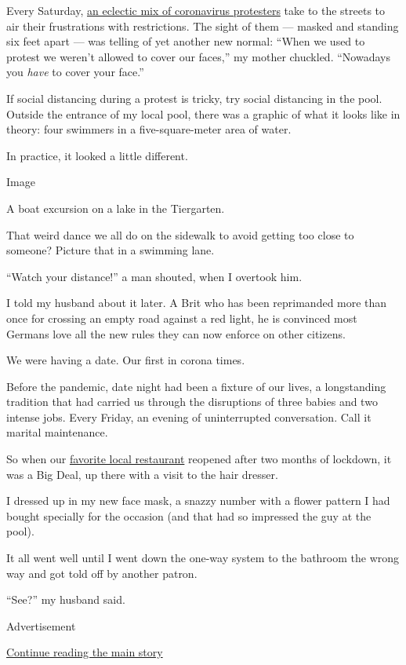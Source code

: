 Every Saturday,
\href{https://www.nytimes.com/2020/05/18/world/europe/coronavirus-germany-far-right.html}{an
eclectic mix of coronavirus protesters} take to the streets to air their
frustrations with restrictions. The sight of them --- masked and
standing six feet apart --- was telling of yet another new normal:
``When we used to protest we weren't allowed to cover our faces,'' my
mother chuckled. ``Nowadays you \emph{have} to cover your face.''

If social distancing during a protest is tricky, try social distancing
in the pool. Outside the entrance of my local pool, there was a graphic
of what it looks like in theory: four swimmers in a five-square-meter
area of water.

In practice, it looked a little different.

Image

A boat excursion on a lake in the Tiergarten.

That weird dance we all do on the sidewalk to avoid getting too close to
someone? Picture that in a swimming lane.

``Watch your distance!'' a man shouted, when I overtook him.

I told my husband about it later. A Brit who has been reprimanded more
than once for crossing an empty road against a red light, he is
convinced most Germans love all the new rules they can now enforce on
other citizens.

We were having a date. Our first in corona times.

Before the pandemic, date night had been a fixture of our lives, a
longstanding tradition that had carried us through the disruptions of
three babies and two intense jobs. Every Friday, an evening of
uninterrupted conversation. Call it marital maintenance.

So when our \href{http://jungbluth-restaurant.de/}{favorite local
restaurant} reopened after two months of lockdown, it was a Big Deal, up
there with a visit to the hair dresser.

I dressed up in my new face mask, a snazzy number with a flower pattern
I had bought specially for the occasion (and that had so impressed the
guy at the pool).

It all went well until I went down the one-way system to the bathroom
the wrong way and got told off by another patron.

``See?'' my husband said.

Advertisement

\protect\hyperlink{after-bottom}{Continue reading the main story}

